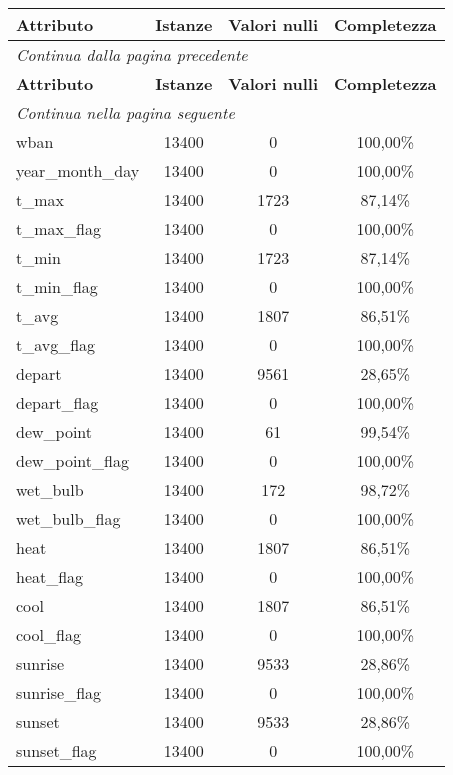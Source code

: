 	\begin{longtable}{lccc}
		\toprule
		\textbf{Attributo} \quad & \textbf{Istanze} & \textbf{Valori nulli} & 
		\textbf{Completezza} \\
		\midrule
		\endfirsthead
		\multicolumn{4}{l}{\footnotesize\itshape Continua dalla pagina precedente} \\
		\toprule
		\textbf{Attributo} \quad & \textbf{Istanze} & \textbf{Valori nulli} & 
		\textbf{Completezza} \\
		\midrule			
		\endhead
		\multicolumn{4}{l}{\footnotesize\itshape Continua nella pagina 
		seguente} \\
		\endfoot
		\endlastfoot
		wban				& 13400 & 0		 	 & 100,00\%  	\\	
		year\_month\_day	& 13400 & 0		 	 & 100,00\%  	\\	
		t\_max				& 13400 & 1723	     & 87,14\%  	\\
		t\_max\_flag		& 13400 & 0		     & 100,00\% 	\\	
		t\_min				& 13400 & 1723	     & 87,14\%  	\\
		t\_min\_flag		& 13400 & 0		     & 100,00\% 	\\	
		t\_avg				& 13400 & 1807	     & 86,51\%  	\\
		t\_avg\_flag		& 13400 & 0		     & 100,00\% 	\\	
		depart				& 13400 & 9561	     & 28,65\%  	\\
		depart\_flag		& 13400 & 0		     & 100,00\% 	\\	
		dew\_point			& 13400 & 61	   	 & 99,54\%  	\\
		dew\_point\_flag	& 13400 & 0		     & 100,00\% 	\\		
		wet\_bulb			& 13400 & 172	     & 98,72\%  	\\
		wet\_bulb\_flag		& 13400 & 0		     & 100,00\% 	\\	
		heat				& 13400 & 1807	     & 86,51\%  	\\
		heat\_flag			& 13400 & 0		     & 100,00\% 	\\	
		cool				& 13400 & 1807	     & 86,51\%  	\\
		cool\_flag			& 13400 & 0		     & 100,00\% 	\\	
		sunrise				& 13400 & 9533	     & 28,86\%  	\\
		sunrise\_flag		& 13400 & 0		     & 100,00\% 	\\	
		sunset				& 13400 & 9533	     & 28,86\%  	\\
		sunset\_flag		& 13400 & 0		     & 100,00\% 	\\	

\end{longtable}
